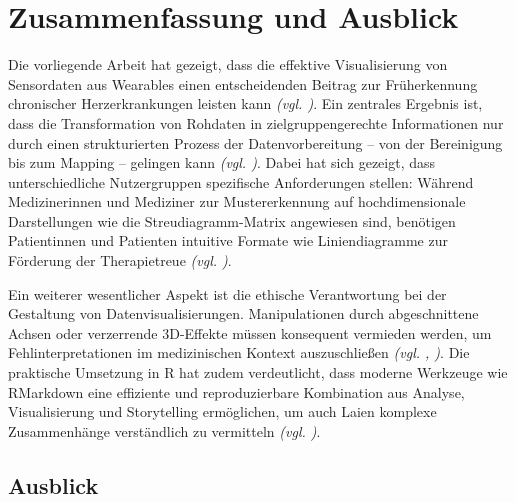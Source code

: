 

\section{Zusammenfassung und Ausblick}

Die vorliegende Arbeit hat gezeigt, dass die effektive Visualisierung von Sensordaten aus Wearables einen entscheidenden Beitrag zur Früherkennung chronischer Herzerkrankungen leisten kann \textit{(\acs{vgl.} \cite[4]{2})}. Ein zentrales Ergebnis ist, dass die Transformation von Rohdaten in zielgruppengerechte Informationen nur durch einen strukturierten Prozess der Datenvorbereitung – von der Bereinigung bis zum Mapping – gelingen kann \textit{(\acs{vgl.} \cite[11, 31]{1})}. Dabei hat sich gezeigt, dass unterschiedliche Nutzergruppen spezifische Anforderungen stellen: Während Medizinerinnen und Mediziner zur Mustererkennung auf hochdimensionale Darstellungen wie die Streudiagramm-Matrix angewiesen sind, benötigen Patientinnen und Patienten intuitive Formate wie Liniendiagramme zur Förderung der Therapietreue \textit{(\acs{vgl.} \cite[7]{2})}.

Ein weiterer wesentlicher Aspekt ist die ethische Verantwortung bei der Gestaltung von Datenvisualisierungen. Manipulationen durch abgeschnittene Achsen oder verzerrende 3D-Effekte müssen konsequent vermieden werden, um Fehlinterpretationen im medizinischen Kontext auszuschließen \textit{(\acs{vgl.} \cite[50]{1}, \cite[43]{2})}. Die praktische Umsetzung in R hat zudem verdeutlicht, dass moderne Werkzeuge wie RMarkdown eine effiziente und reproduzierbare Kombination aus Analyse, Visualisierung und Storytelling ermöglichen, um auch Laien komplexe Zusammenhänge verständlich zu vermitteln \textit{(\acs{vgl.} \cite[1, 55]{3})}.

\subsection{Ausblick}


